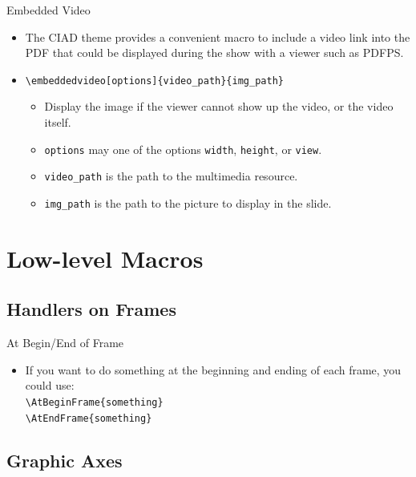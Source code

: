 \documentclass[english,sectioncirclenumberstyle]{ciadbeamer}
\begin{document}
\begin{frame}[t]{Embedded Video}
	\begin{itemize}
	\item The CIAD theme provides a convenient macro to include a video link into the PDF that could be displayed during the show with a viewer such as PDFPS.
	\item \texttt{{\textbackslash}embeddedvideo[options]\{video\_path\}\{img\_path\}}
		\begin{itemize}
		\item Display the image if the viewer cannot show up the video, or the video itself.
		\item \texttt{options} may one of the options \texttt{width}, \texttt{height}, or \texttt{view}.
		\item \texttt{video\_path} is the path to the multimedia resource.
		\item \texttt{img\_path} is the path to the picture to display in the slide.
		\end{itemize}
	\end{itemize}
\end{frame}


\section{Low-level Macros}
\tableofcontentslide[sectionstyle={show/shaded},subsectionstyle={show/show/hide},subsubsectionstyle={hide/hide/hide/hide},sections={3-}]

\subsection{Handlers on Frames}

\begin{frame}{At Begin/End of Frame}
	\begin{itemize}
	\item If you want to do something at the beginning and ending of each frame, you could use: \\
		\texttt{{\textbackslash}AtBeginFrame\{something\}} \\
		\texttt{{\textbackslash}AtEndFrame\{something\}}
	\end{itemize}
\end{frame}

\subsection{Graphic Axes}
\end{document}
